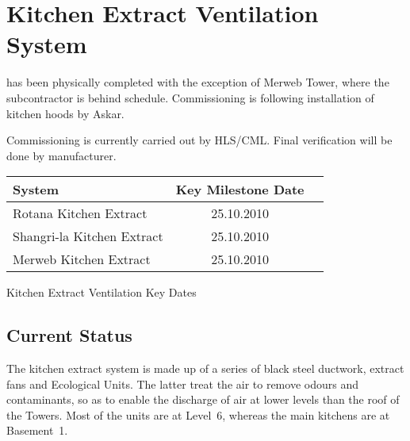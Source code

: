 \newcommand{\keextracton}{25.10.2010}
\newcommand{\ecolon}{25.10.2010}           %
\newcommand{\podiumon}{26.10.2010}
\newcommand{\toweron}{15.10.2010}
\newcommand{\kdpoweron}{20.10.2010}

\chapter{Kitchen Extract Ventilation System }

 has been physically completed with the exception of Merweb Tower, where the subcontractor is behind schedule. Commissioning is following installation of kitchen hoods by Askar.

Commissioning is currently carried out by HLS/CML. Final verification will be done by manufacturer. 



           \begin{margintable} 
	    \begin{tabular}{lcl}
	      \toprule
	      System    & Key Milestone Date  \\
	      \midrule

                 Rotana Kitchen Extract       &  \ecolon  \\   
                 Shangri-la Kitchen Extract   & \ecolon\\
	     Merweb Kitchen Extract       &  \ecolon  \\
	      
	      \bottomrule
	    \end{tabular}
           \caption{Kitchen Extract Ventilation Key Dates}
           \label{tbl:KEkeydates}
            \end{margintable}
 

\section{Current Status}

The kitchen extract system is made up of a series of black steel ductwork, extract fans and Ecological Units. The latter treat the air to  remove odours and contaminants, so as to enable the discharge of air at lower levels than the roof of the Towers. Most of the units are at Level~6, whereas the main kitchens are at Basement~1. 

